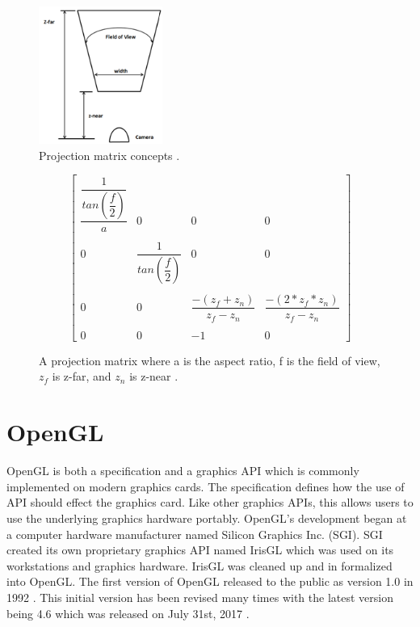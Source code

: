 \documentclass{article}
\begin{document}
\begin{figure}[h]
	\centering
	\includegraphics[height=4.5cm]{projection-matrix}
	\caption{Projection matrix concepts \cite{hernandez2019}.}
	\label{fig:projection}
\end{figure}

\begin{figure}[h]
    \[
	  \begin{bmatrix}
        \dfrac{\dfrac{1}{tan(\dfrac{f}{2})}}{a}  & 0 & 0 & 0 \\ \\
        0 & \dfrac{1}{tan(\dfrac{f}{2})} & 0 & 0 \\ \\
        0 & 0 & \dfrac{-(z_f + z_n)}{z_f - z_n} & \dfrac{-(2 * z_f * z_n)}{z_f - z_n} \\ \\
        0 & 0 & -1 & 0
      \end{bmatrix}
    \]
    \caption{A projection matrix where a is the aspect ratio, f is the field of view, $z_f$ is z-far, and $z_n$ is z-near \cite{hernandez2019}.}
    \label{fig:matrix}
\end{figure}

\section{OpenGL}
OpenGL is both a specification and a graphics API which is commonly implemented on modern graphics cards. The specification defines how the use of API should effect the graphics card. Like other graphics APIs, this allows users to use the underlying graphics hardware portably. OpenGL's development began at a computer hardware manufacturer named Silicon Graphics Inc. (SGI). SGI created its own proprietary graphics API named IrisGL which was used on its workstations and graphics hardware. IrisGL was cleaned up and in formalized into OpenGL. The first version of OpenGL released to the public as version 1.0 in 1992 \cite{openglwiki2018}. This initial version has been revised many times with the latest version being 4.6 which was released on July 31st, 2017 \cite{openglwiki2018}.
\end{document}
